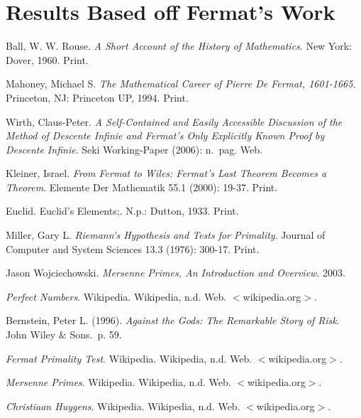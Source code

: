 \documentclass[11pt]{article}
\begin{document}
\section*{Results Based off Fermat's Work}

\begin{thebibliography}{9}
    Ball, W. W. Rouse. \emph{A Short Account of the History of Mathematics}. New York: Dover, 1960. Print.

    Mahoney, Michael S. \emph{The Mathematical Career of Pierre De Fermat, 1601-1665}. Princeton, NJ: Princeton UP, 1994. Print.

    Wirth, Claus-Peter.
    \emph{A Self-Contained and Easily Accessible Discussion of the Method of Descente Infinie and Fermat's Only Explicitly Known Proof by Descente Infinie}.
    Seki Working-Paper (2006): n.\ pag. Web.

    Kleiner, Israel.
    \emph{From Fermat to Wiles: Fermat's Last Theorem Becomes a Theorem}.
    Elemente Der Mathematik 55.1 (2000): 19-37. Print.

    Euclid. Euclid's Elements;. N.p.: Dutton, 1933. Print.

    Miller, Gary L.
    \emph{Riemann's Hypothesis and Tests for Primality}.
    Journal of Computer and System Sciences 13.3 (1976): 300-17. Print.

    Jason Wojciechowski.
    \emph{Mersenne Primes, An Introduction and Overview}. 2003.


    \emph{Perfect Numbers}. Wikipedia. Wikipedia, n.d. Web. $<$wikipedia.org$>$.

    Bernstein, Peter L. (1996).
    \emph{Against the Gods: The Remarkable Story of Risk}. John Wiley \& Sons.\ p. 59.


    \emph{Fermat Primality Test}. Wikipedia. Wikipedia, n.d. Web. $<$wikipedia.org$>$.



    \emph{Mersenne Primes}. Wikipedia. Wikipedia, n.d. Web. $<$wikipedia.org$>$.

    \emph{Christiaan Huygens}. Wikipedia. Wikipedia, n.d. Web. $<$wikipedia.org$>$.

\end{thebibliography}
\end{document}
